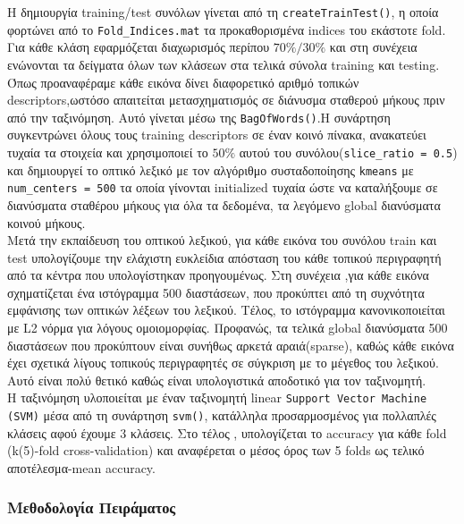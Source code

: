 \documentclass[12pt, a4paper]{article}
\begin{document}
Η δημιουργία training/test συνόλων γίνεται από τη \texttt{createTrainTest()},
η οποία φορτώνει από το \texttt{Fold\_Indices.mat} τα προκαθορισμένα indices
του εκάστοτε fold. Για κάθε κλάση εφαρμόζεται διαχωρισμός περίπου
$70\% / 30\%$ και στη συνέχεια ενώνονται τα δείγματα όλων των κλάσεων στα
τελικά σύνολα training και testing.\\
Όπως προαναφέραμε κάθε εικόνα δίνει διαφορετικό αριθμό τοπικών descriptors,ωστόσο απαιτείται
μετασχηματισμός σε διάνυσμα σταθερού μήκους πριν από την ταξινόμηση. Αυτό
γίνεται μέσω της \texttt{BagOfWords()}.Η συνάρτηση συγκεντρώνει όλους τους
training descriptors σε έναν κοινό πίνακα, ανακατεύει τυχαία τα στοιχεία και
χρησιμοποιεί το $50\%$ αυτού του συνόλου(\texttt{slice\_ratio = 0.5}) και δημιουργεί
το οπτικό λεξικό με τον αλγόριθμο συσταδοποίησης \texttt{kmeans}  με \texttt{num\_centers = 500} τα οποία γίνονται initialized  τυχαία ώστε να καταλήξουμε σε διανύσματα σταθέρου μήκους για όλα τα δεδομένα, τα λεγόμενο global διανύσματα κοινού
μήκους.\\

Μετά την εκπαίδευση του οπτικού λεξικού, για κάθε εικόνα του συνόλου train και test υπολογίζουμε την ελάχιστη ευκλείδια
απόσταση του κάθε τοπικού περιγραφητή από τα κέντρα που υπολογίστηκαν προηγουμένως. Στη συνέχεια ,για κάθε εικόνα σχηματίζεται ένα ιστόγραμμα 500 διαστάσεων,
που προκύπτει από τη συχνότητα εμφάνισης των οπτικών λέξεων του λεξικού. Τέλος, το ιστόγραμμα κανονικοποιείται με L2 νόρμα για λόγους ομοιομορφίας. Προφανώς, τα τελικά global διανύσματα 500 διαστάσεων που προκύπτουν είναι συνήθως 
αρκετά αραιά(sparse), καθώς κάθε εικόνα έχει σχετικά λίγους τοπικούς περιγραφητές σε σύγκριση με το μέγεθος του λεξικού. Αυτό είναι πολύ θετικό καθώς είναι υπολογιστικά αποδοτικό για τον ταξινομητή.\\

Η ταξινόμηση υλοποιείται με έναν ταξινομητή  linear \texttt{Support Vector Machine (SVM)} μέσα από τη συνάρτηση \texttt{svm()}, κατάλληλα προσαρμοσμένος για πολλαπλές κλάσεις
αφού έχουμε 3 κλάσεις. Στο τέλος , υπολογίζεται το accuracy για κάθε fold (k(5)-fold cross-validation) και αναφέρεται ο μέσος όρος των 5 folds ως τελικό αποτέλεσμα-mean accuracy.

\subsubsection{Μεθοδολογία Πειράματος}
\end{document}
